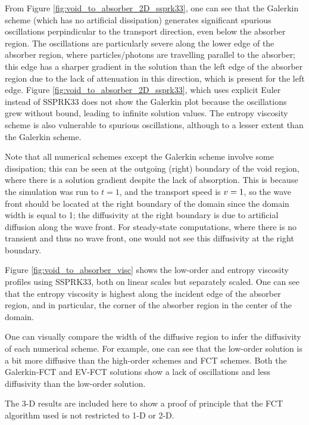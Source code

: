 From Figure \ref{fig:void_to_absorber_2D_ssprk33}, one can see that the
Galerkin scheme (which has no artificial dissipation) generates significant
spurious oscillations perpindicular to the transport direction, even below the
absorber region. The oscillations are particularly severe along the lower edge
of the absorber region, where particles/photons are travelling parallel to the
absorber; this edge has a sharper gradient in the solution than the left edge
of the absorber region due to the lack of attenuation in this direction, which
is present for the left edge. Figure \ref{fig:void_to_absorber_2D_ssprk33},
which uses explicit Euler instead of SSPRK33 does not show the Galerkin plot
because the oscillations grew without bound, leading to infinite solution
values. The entropy viscosity scheme is also vulnerable to spurious
oscillations, although to a lesser extent than the Galerkin scheme.

Note that all numerical schemes except the Galerkin scheme involve some
dissipation; this can be seen at the outgoing (right) boundary of the void
region, where there is a solution gradient despite the lack of
absorption. This is because the simulation was run to $t=1$, and the transport
speed is $v=1$, so the wave front should be located at the right
boundary of the domain since the domain width is equal to 1;
the diffusivity at the right boundary is due to artificial diffusion
along the wave front.
For steady-state computations, where there is no transient and
thus no wave front, one would not see this diffusivity
at the right boundary.

Figure \ref{fig:void_to_absorber_visc} shows the low-order and entropy
viscosity profiles using SSPRK33, both on linear scales but separately
scaled. One can see that the entropy viscosity
is highest along the incident edge of the absorber region, and in
particular, the corner of the absorber region in the center of the
domain.

One can visually compare the width of the diffusive region to infer the
diffusivity of each numerical scheme. For example, one can see that the
low-order solution is a bit more diffusive than the high-order schemes and FCT
schemes.  Both the Galerkin-FCT and EV-FCT solutions show a lack of
oscillations and less diffusivity than the low-order solution.

The 3-D results are included here to show a proof of principle
that the FCT algorithm used is not restricted to 1-D or 2-D.

